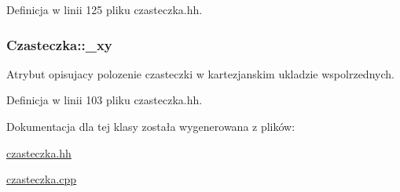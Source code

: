 Definicja w linii 125 pliku czasteczka.\-hh.

\hypertarget{class_czasteczka_a025a3ee895f8ee9c765814cfca1fd5e1}{
\subsubsection[{\-\_\-xy}]{ Czasteczka\-::\-\_\-xy\hspace{0.3cm}{\ttfamily [private]}}}\label{class_czasteczka_a025a3ee895f8ee9c765814cfca1fd5e1}
Atrybut opisujacy polozenie czasteczki w kartezjanskim ukladzie wspolrzednych. 

Definicja w linii 103 pliku czasteczka.\-hh.



Dokumentacja dla tej klasy została wygenerowana z plików\-:\begin{DoxyCompactItemize}
\item 
\hyperlink{czasteczka_8hh}{czasteczka.\-hh}\item 
\hyperlink{czasteczka_8cpp}{czasteczka.\-cpp}\end{DoxyCompactItemize}
